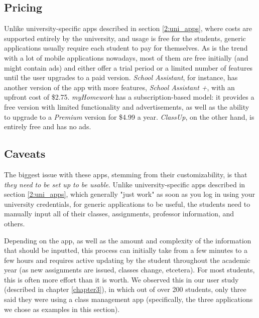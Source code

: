     \subsection{Pricing} \label{2:generic_apps_pricing}
        Unlike university-specific apps described in section \ref{2:uni_apps}, where costs are supported entirely by the university, and usage is free for the students, generic applications usually require each student to pay for themselves. As is the trend with a lot of mobile applications nowadays, most of them are free initially (and might contain ads) and either offer a trial period or a limited number of features until the user upgrades to a paid version. \textit{School Assistant}, for instance, has another version of the app with more features, \textit{School Assistant +}, with an upfront cost of \$2.75. \textit{myHomework} has a subscription-based model: it provides a free version with limited functionality and advertisements, as well as the ability to upgrade to a \textit{Premium} version for \$4.99 a year. \textit{ClassUp}, on the other hand, is entirely free and has no ads.
        
    \subsection{Caveats} \label{2:generic_apps_caveats}
        The biggest issue with these apps, stemming from their customizability, is that \textit{they need to be set up to be usable}. Unlike university-specific apps described in section \ref{2:uni_apps}, which generally "just work" as soon as you log in using your university credentials, for generic applications to be useful, the students need to manually input all of their classes, assignments, professor information, and others. 
        
        Depending on the app, as well as the amount and complexity of the information that should be inputted, this process can initially take from a few minutes to a few hours and requires active updating by the student throughout the academic year (as new assignments are issued, classes change, etcetera). For most students, this is often more effort than it is worth. We observed this in our user study (described in chapter \ref{chapter3}), in which out of over 200 students, only three said they were using a class management app (specifically, the three applications we chose as examples in this section).
        

